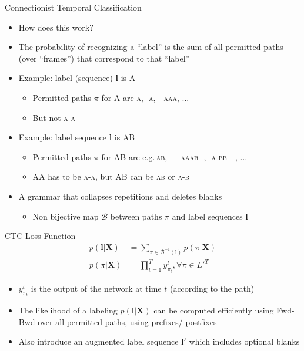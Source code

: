 \begin{frame}{Connectionist Temporal Classification}
  \begin{itemize}
  \item How does this work?
  \item The probability of recognizing a ``label'' is the sum of all permitted paths
    (over ``frames'') that correspond to that ``label''
  \item Example: label (sequence) $\boldsymbol{l}$ is \textsc{A}
    \begin{itemize}
    \item Permitted paths $\pi$ for \textsc{A} are \textsc{a}, \textsc{-a}, \textsc{{-}-aaa}, ...
    \item But not \textsc{a-a}
    \end{itemize}
  \item Example: label sequence $\boldsymbol{l}$ is \textsc{AB}
    \begin{itemize}
    \item Permitted paths $\pi$ for \textsc{AB} are e.g.\,\textsc{ab}, \textsc{{-}-{-}-aaab-{-}}, \textsc{-a-bb-{-}-}, ...
      \item \textsc{AA} has to be \textsc{a-a}, but \textsc{AB} can be \textsc{ab} or \textsc{a-b}
    \end{itemize}
  \item A grammar that collapses repetitions and deletes blanks
    \begin{itemize}
    \item Non bijective map $\mathcal{B}$ between paths $\pi$ and label sequences $\boldsymbol{l}$
    \end{itemize}
  \end{itemize}
\end{frame}

\begin{frame}{CTC Loss Function}
  \begin{align}
    p(\boldsymbol{l}|\boldsymbol{X})   & = \sum_{\pi \in \mathcal{B}^{-1}(\boldsymbol{l})} p(\pi|\boldsymbol{X})\\
    p(\pi|\boldsymbol{X}) & = \prod_{t=1}^T y^t_{\pi_t}, \forall \pi \in L'^T
  \end{align}
  \begin{itemize}
  \item $y^t_{\pi_t}$ is the output of the network at time $t$ (according to the path)
  \item The likelihood of a labeling $p(\boldsymbol{l}|\boldsymbol{X})$ can be computed efficiently using Fwd-Bwd over all permitted paths, using prefixes/ postfixes
  \item Also introduce an augmented label sequence $\boldsymbol{l'}$ which includes optional blanks
  \end{itemize}
\end{frame}

